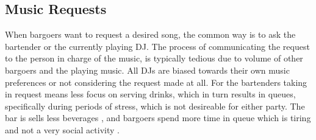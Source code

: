 \subsection{Music Requests}

When bargoers want to request a desired song, the common way is to ask the bartender or the currently playing DJ. The process of communicating the request to the person in charge of the music, is typically tedious due to volume of other bargoers and the playing music. All DJs are biased towards their own music preferences or not considering the request made at all. For the bartenders taking in request means less focus on serving drinks, which in turn results in queues, specifically during periods of stress, which is not desireable for either party. The bar is sells less beverages \cite{Queues gives lower income}, and bargoers spend more time in queue which is tiring and not a very social activity \cite{Queues er træls}.